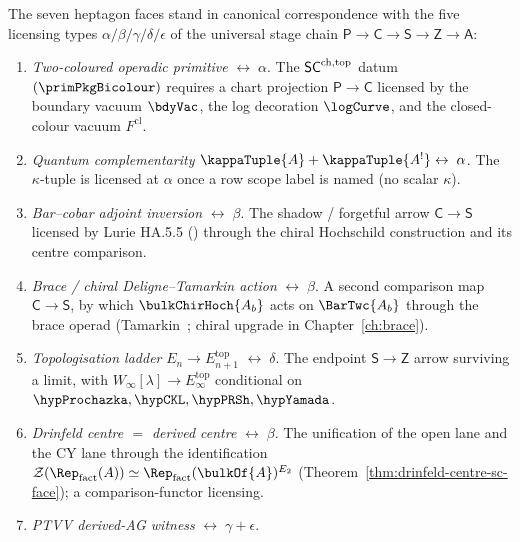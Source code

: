 \begin{remark}
\label{rem:heptagon-licensing-duality}%
%
%
%
The seven heptagon faces stand in canonical correspondence with
the five licensing types $\alpha / \beta / \gamma / \delta / \epsilon$
of the universal stage chain
$\mathsf{P} \to \mathsf{C} \to \mathsf{S} \to \mathsf{Z} \to \mathsf{A}$:
\begin{enumerate}[label=\textup{(\arabic*)}]
\item \emph{Two-coloured operadic primitive} $\leftrightarrow\;\alpha$.
The $\mathsf{SC}^{\mathrm{ch},\mathrm{top}}$ datum $(\primPkgBicolour)$ requires a chart
projection $\mathsf{P} \to \mathsf{C}$ licensed by the boundary
vacuum $\bdyVac$, the log decoration $\logCurve$, and the
closed-colour vacuum $F^{\mathrm{cl}}$.
\item \emph{Quantum complementarity}
$\kappaTuple{A} + \kappaTuple{A^!}\leftrightarrow\;\alpha$.
The $\kappa$-tuple is licensed at $\alpha$ once a row scope
label is named (no scalar $\kappa$).
\item \emph{Bar--cobar adjoint inversion} $\leftrightarrow\;\beta$.
The shadow / forgetful arrow $\mathsf{C} \to \mathsf{S}$ licensed
by Lurie HA.5.5 (\cite{LurieHA}) through the chiral Hochschild
construction and its centre comparison.
\item \emph{Brace / chiral Deligne--Tamarkin action}
$\leftrightarrow\;\beta$.
A second comparison map $\mathsf{C} \to \mathsf{S}$, by which
$\bulkChirHoch{A_b}$ acts on $\BarTwc{A_b}$ through the brace
operad (Tamarkin~\cite{Tamarkin2003}; chiral upgrade in
Chapter~\ref{ch:brace}).
\item \emph{Topologisation ladder}
$E_n \to E_{n+1}^{\mathrm{top}}$ $\leftrightarrow\;\delta$.
The endpoint $\mathsf{S} \to \mathsf{Z}$ arrow surviving a limit,
with $W_\infty[\lambda] \to E_\infty^{\mathrm{top}}$ conditional
on $\hypProchazka, \hypCKL, \hypPRSh, \hypYamada$.
\item \emph{Drinfeld centre $=$ derived centre}
$\leftrightarrow\;\beta$.
The unification of the open lane and the CY lane through the
identification
$\cZ(\Rep_{\mathrm{fact}}(A)) \simeq \Rep_{\mathrm{fact}}(\bulkOf{A})^{E_2}$
(Theorem~\ref{thm:drinfeld-centre-sc-face}); a comparison-functor
licensing.
\item \emph{PTVV derived-AG witness}
$\leftrightarrow\;\gamma + \epsilon$.

\end{enumerate}
\end{remark}

